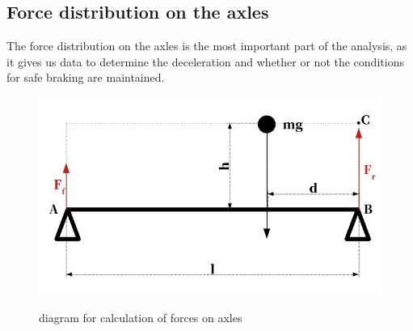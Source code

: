 \documentclass[12pt]{article}
\begin{document}
\begin{figure}[h]
\begin{subfigure}[b]{0.4\linewidth}
\caption{}%
\label{fig:beam_diagram}
\end{subfigure}%
\label{fig:theoretical_models}
\end{figure}

\newpage

\subsection{Force distribution on the axles}
The force distribution on the axles is the most important part of the analysis, as it gives us data to 
determine the deceleration and whether or not the conditions for safe braking are maintained.
\begin{figure}[H]
\caption{diagram for calculation of forces on axles}
\includegraphics[width=\linewidth]{static_forces_simplified}%
\label{fig:static_diagram}
\end{figure}
\end{document}
